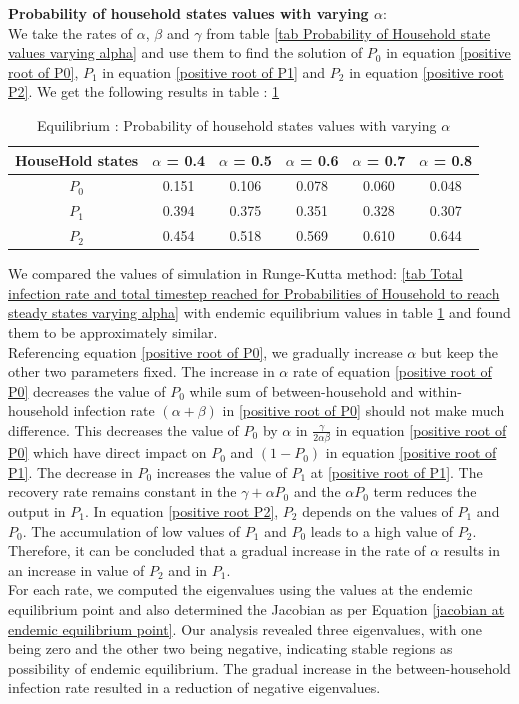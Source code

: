 \documentclass[paper=a4, fontsize=11pt, twoside, BCOR=12mm, parskip=full, listof=totoc]{scrreprt}
\begin{document}
{\textbf{Probability of household states values with varying $\alpha$}: \\
We take the rates of $\alpha$, $\beta$ and $\gamma$ from table \ref{tab Probability of Household state values varying alpha} and use them to find the solution of $P_0$ in equation \ref{positive root of P0}, $P_1$ in equation \ref{positive root of P1} and $P_2$ in equation \ref{positive root P2}. We get the following results in table : \ref{root table Household state values varying alpha}
\begin{table}[H]
	\centering 
	\caption{Equilibrium : Probability of household states values with varying $\alpha$}
	\label{root table Household state values varying alpha}
	\begin{tabular}{cccccc}
	\toprule
     HouseHold states & $\alpha$ = 0.4  & $\alpha$ = 0.5 & $\alpha$ = 0.6 & $\alpha$ = 0.7 & $\alpha$ = 0.8 \\
     \midrule
	 $P_0$ & 0.151  & 0.106  & 0.078  & 0.060  & 0.048 \\
	 $P_1$ & 0.394  & 0.375  & 0.351  & 0.328  & 0.307 \\
	 $P_2$ & 0.454  & 0.518  & 0.569  & 0.610  & 0.644 \\
	\bottomrule
	\end{tabular}
\end{table}
We compared the values of simulation in Runge-Kutta method: \ref{tab Total infection rate and total timestep reached for Probabilities of Household to reach steady states varying alpha} with endemic equilibrium values in table \ref{root table Household state values varying alpha} and found them to be approximately similar.\\ 
Referencing equation \ref{positive root of P0}, we gradually increase $\alpha$ but keep the other two parameters fixed. The increase in $\alpha$ rate of equation \ref{positive root of P0}  decreases the value of $P_0$ while sum of between-household and within-household infection rate $(\alpha + \beta)$ in \ref{positive root of P0} should not make much difference. This decreases the value of $P_0$ by $\alpha$ in $\frac{\gamma}{2\alpha\beta}$ in equation \ref{positive root of P0} which have direct impact on $P_0$ and \( (1-P_0) \) in equation \ref{positive root of P1}. The decrease in $P_0$ increases the value of $P_1$ at \ref{positive root of P1}. The recovery rate remains constant in the \( \gamma + \alpha P_0 \) and the $\alpha P_0$ term reduces the output in $P_1$. In equation \ref{positive root P2}, $P_2$ depends on the values of $P_1$ and $P_0$. The accumulation of low values of $P_1$ and $P_0$ leads to a high value of $P_2$. Therefore, it can be concluded that a gradual increase in the rate of $\alpha$ results in an increase in value of $P_2$ and in $P_1$.\\
For each rate, we computed the eigenvalues using the values at the endemic equilibrium point and also determined the Jacobian as per Equation \ref{jacobian at endemic equilibrium point}. Our analysis revealed three eigenvalues, with one being zero and the other two being negative, indicating stable regions as possibility of endemic equilibrium. The gradual increase in the between-household infection rate resulted in a reduction of negative eigenvalues.\\ 

}
\end{document}
